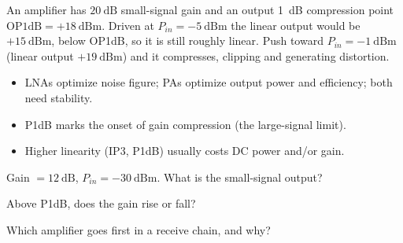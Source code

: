 \begin{workedexample}
An amplifier has $20\ \text{dB}$ small-signal gain and an output 1~dB
compression point $\text{OP1dB} = +18\ \text{dBm}$. Driven at
$P_{in} = -5\ \text{dBm}$ the linear output would be $+15\ \text{dBm}$, below
OP1dB, so it is still roughly linear. Push toward $P_{in} = -1\ \text{dBm}$
(linear output $+19\ \text{dBm}$) and it compresses, clipping and generating
distortion.
\end{workedexample}

\begin{keytakeaways}
\begin{itemize}[leftmargin=1.4em,itemsep=2pt]
\item LNAs optimize noise figure; PAs optimize output power and efficiency; both need stability.
\item P1dB marks the onset of gain compression (the large-signal limit).
\item Higher linearity (IP3, P1dB) usually costs DC power and/or gain.
\end{itemize}
\end{keytakeaways}

\begin{exercises}
\item Gain $= 12\ \text{dB}$, $P_{in} = -30\ \text{dBm}$. What is the small-signal output?
\item Above P1dB, does the gain rise or fall?
\item Which amplifier goes first in a receive chain, and why?
\end{exercises}

